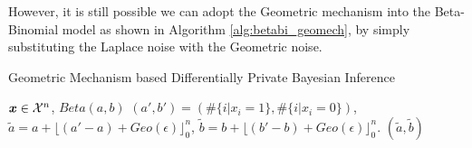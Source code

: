 \documentclass{article}
\begin{document}
However, it is still possible we can adopt the Geometric mechanism into the Beta-Binomial model as shown in Algorithm \ref{alg:betabi_geomech}, by simply substituting the Laplace noise with the Geometric noise.

\begin{algorithm}
  \caption{Geometric Mechanism based Differentially Private Bayesian Inference}
  \label{alg:betabi_geomech}
  \begin{algorithmic}
  \STATE $\boldsymbol{x}\in\mathcal{X}^n$, $Beta(a, b)$
  \STATE {} $(a', b') = (\#\{i | x_i = 1\}, \#\{i | x_i = 0\})$, 
  \STATE {} $\tilde{a} = a + \lfloor{(a' - a)+ Geo({\epsilon}) }\rfloor^n_0$,
  $\tilde{b} = b + \lfloor{(b' - b)+ Geo({{\epsilon}}) }\rfloor^n_0$.
   $(\tilde{a}, \tilde{b})$
  \end{algorithmic}
\end{algorithm}
%
\end{document}
